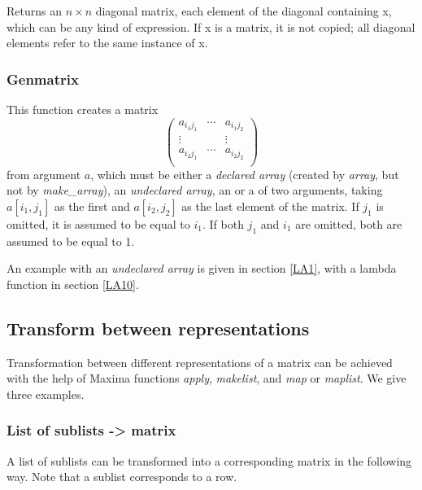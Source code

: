 \documentclass[../Maxima_Workbook.tex]{subfiles}
\begin{document}
\lz Returns an $ n \times n $ diagonal matrix, each element of the diagonal containing x, which can be any kind of expression. If x is a matrix, it is not copied; all diagonal elements refer to the same instance of x.

\subsubsection{Genmatrix}

\lz {} \hfill \tcr{[function]}

\lz This function creates a matrix 
\begin{equation*}
	\begin{pmatrix}
	a_{i_1 j_1} & \cdots & a_{i_1 j_2} \\
	\vdots & & \vdots \\
	a_{i_2 j_1} & \cdots & a_{i_2 j_2} \\
	\end{pmatrix}
\end{equation*}
from argument $ a $, which must be either a \emph{declared array} (created by \emph{array}, but not by \emph{make\_array}), an \emph{undeclared array}, an  or a  of two arguments, taking $ a[i_1, j_1] $ as the first and $ a[i_2, j_2] $ as the last element of the matrix. If $ j_1 $ is omitted, it is assumed to be equal to $ i_1 $. If both $ j_1 $ and $ i_1 $ are omitted, both are assumed to be equal to 1.

\lz An example with an \emph{undeclared array} is given in section \ref{LA1}, with a lambda function in section \ref{LA10}.

\subsection{Transform between representations}

Transformation between different representations of a matrix can be achieved with the help of Maxima functions \emph{apply}, \emph{makelist}, and \emph{map} or \emph{maplist}. We give three examples.

\subsubsection{List of sublists -> matrix}

A list of sublists can be transformed into a corresponding matrix in the following way. Note that a sublist corresponds to a row.
\end{document}
